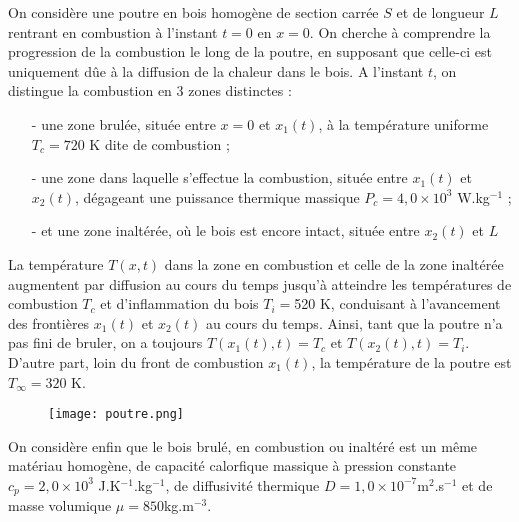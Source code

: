 On considère une poutre en bois homogène de section carrée $S$ et de longueur $L$ rentrant en combustion à l'instant $t=0$ en $x=0$. On cherche à comprendre la progression de la combustion le long de la poutre, en supposant que celle-ci est uniquement dûe à la diffusion de la chaleur dans le bois. 
A l'instant $t$, on distingue la combustion en 3 zones distinctes :
\begin{itemize}
	\item[-] une zone brulée, située entre $x=0$ et $x_1(t)$, à la température uniforme $T_c=720$ K dite de combustion ;
	\item[-] une zone dans laquelle s'effectue la combustion, située entre $x_1(t)$ et $x_2(t)$, dégageant une puissance thermique massique $P_c=4,0\times10^3$ W.kg$^{-1}$ ;
	\item[-] et une zone inaltérée, où le bois est encore intact, située entre $x_2(t)$ et $L$
\end{itemize}
La température $T(x,t)$ dans la zone en combustion et celle de la zone inaltérée augmentent par diffusion au cours du temps jusqu’à atteindre les températures de combustion $T_c$ et d’inflammation du bois $T_i=$520 K, conduisant à l’avancement des frontières $x_1(t)$ et $x_2(t)$ au cours du temps. Ainsi, tant que la poutre n’a pas fini de bruler, on a toujours $T(x_1(t),t)=T_c$ et $T(x_2(t),t)=T_i$. D'autre part, loin du front de combustion $x_1(t)$, la température de la poutre est $T_\infty=320$ K.

\begin{figure}[h!]
\centering
  \texttt{[image: poutre.png]}
\end{figure}

On considère enfin que le bois brulé, en combustion ou inaltéré est un même matériau homogène, de capacité calorfique massique à pression constante $c_p=2,0\times10^3$ J.K$^{-1}$.kg$^{-1}$, de diffusivité thermique $D=1,0\times10^{-7}$m$^2$.s$^{-1}$ et de masse volumique $\mu=850$kg.m$^{-3}$.

